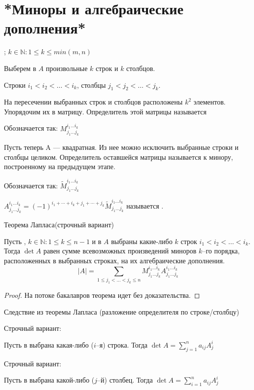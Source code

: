 \section{*Миноры и алгебраические дополнения*}
\begin{opred}
; $k\in\mathbb{N}:1\leq{}k\leq{}min(m,n)$

Выберем в $A$ произвольные $k$ строк и $k$ столбцов.

Строки $i_1<i_2<\ldots<i_k$, столбцы  $j_1<j_2<\ldots<j_k$.

На пересечении выбранных строк и столбцов расположены $k^2$ элементов. Упорядочим их в матрицу. Определитель этой матрицы называется 

Обозначается так: $M^{i_1\ldots{}i_k}_{j_1\ldots{}j_k}$
\end{opred}
\begin{opred}
Пусть теперь A --- квадратная. Из нее можно исключить выбранные строки и столбцы целиком. Определитель оставшейся матрицы называется  к минору, построенному на предыдущем этапе.

Обозначается так: $\tilde{M}^{i_1\ldots{}i_k}_{j_1\ldots{}j_k}$
\end{opred}
\begin{opred}
$A^{i_1\ldots{}i_k}_{j_1\ldots{}j_k}=(-1)^{i_1+\cdots+i_k+j_1+\cdots+j_k}\tilde{M}^{i_1\ldots{}i_k}_{j_1\ldots{}j_k}$ называется .
\end{opred}
\begin{theor}Теорема Лапласа(строчный вариант)

Пусть , $k\in\mathbb{N}:1\leq{}k\leq{}n-1$ и в $A$ выбраны какие-либо $k$ строк $i_1<i_2<\ldots<i_k$. Тогда $\det{A}$ равен сумме всевозможных произведений миноров $k$--го порядка, расположенных в выбранных строках, на их алгебраические дополнения.
$$
|A|=\sum\limits_{1\leq{}j_1<\ldots<j_k\leq{}n}M^{i_1\ldots{}i_k}_{j_1\ldots{}j_k}A^{i_1\ldots{}i_k}_{j_1\ldots{}j_k}
$$
\end{theor}
\begin{proof}
На потоке бакалавров теорема идет без доказательства.
\end{proof}
\begin{theor}Следствие из теоремы Лапласа (разложение определителя по строке/столбцу)

Строчный вариант:

Пусть в  выбрана какая-либо ($i$--я) строка. Тогда $\det{A}=\sum\limits_{j=1}^na_{ij}A^i_j$

Строчный вариант:

Пусть в  выбрана какой-либо ($j$--й) столбец. Тогда $\det{A}=\sum\limits_{i=1}^na_{ij}A^i_j$
\end{theor}
